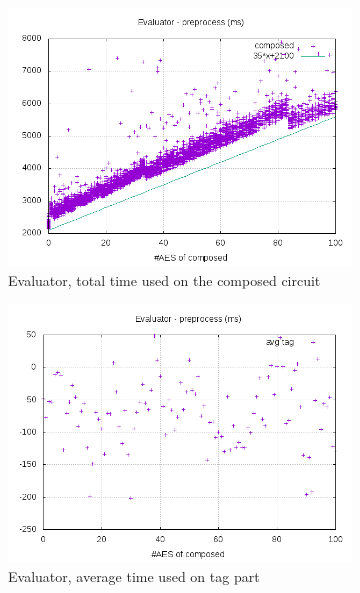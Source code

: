 \documentclass[10pt,a4paper]{article}
\begin{document}
\begin{figure}[h]
    \begin{subfigure}[t]{0.3\textwidth}
        \includegraphics[width=\textwidth]{eval_preprocess_plots}
        \caption{Evaluator, total time used on the composed circuit}
    \end{subfigure}
    \begin{subfigure}[t]{0.3\textwidth}
        \includegraphics[width=\textwidth]{eval_preprocess_avg}
        \caption{Evaluator, average time used on tag part}
    \end{subfigure}
    \begin{subfigure}[t]{0.3\textwidth}

\end{subfigure}
\end{figure}
\end{document}
